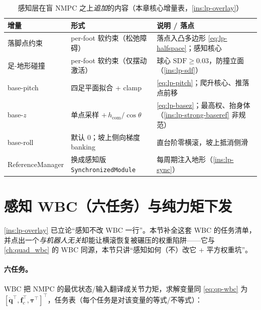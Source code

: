 \begin{table}[H]\centering\small
\caption{感知层在盲 NMPC 之上\emph{追加}的内容（本章核心增量表，\cref{ins:lp-overlay}）}
\begin{tabular}{p{} p{} p{}}
\toprule
增量 & 形式 & 说明 / 落点 \\
\midrule
落脚点约束 & per-foot 软约束（松弛障碍）& 落点入凸多边形 \cref{eq:lp-halfspace}；感知核心 \\
足-地形碰撞 & per-foot 软约束（仅摆动激活）& 球心 $\mathrm{SDF}\ge 0.03$，防撞立面（\cref{ins:lp-sdf}）\\
base-pitch & 四足平面拟合 + clamp & \cref{eq:lp-pitch}；爬升核心、推落点前移 \\
base-$z$ & 单点采样 $+\,h_{\mathrm{com}}/\cos\theta$ & \cref{eq:lp-basez}；最高权、抬身体（\cref{ins:lp-strong-baseref} 非规范）\\
base-roll & 默认 $0$；坡上侧向梯度 banking & 直台阶零横滚，坡上抵消侧滑 \\
ReferenceManager & 换成感知版 \texttt{SynchronizedModule} & 每周期注入地形（\cref{ins:lp-sync}）\\
\bottomrule
\end{tabular}
\label{tab:lp-increment}
\end{table}

\section{感知 WBC（六任务）与纯力矩下发}
\label{sec:lp-wbc}

\cref{ins:lp-overlay} 已立论“感知不改 WBC 一行”。本节补全这套 WBC 的任务清单，并点出一个\emph{与机器人无关}却能让横滚恢复被碾压的权重陷阱——它与 \cref{ch:quad_wbc} 的 WBC 同源，本节只讲“感知如何（不）改它 + 平方权重坑”。

\paragraph{六任务。}
WBC 把 NMPC 的最优状态/输入翻译成关节力矩，求解变量同 \cref{eq:qp-wbc} 为 $[\ddot{\mathbf{q}}^\top,\mathbf{f}_c^\top,\boldsymbol{\tau}^\top]^\top$，任务表（每个任务是对该变量的等式/不等式）：

